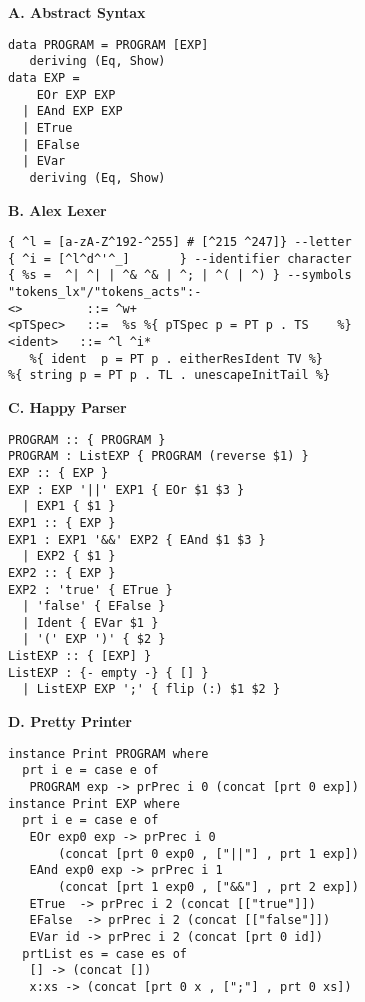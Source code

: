 \begin{figure}
\begin{boxedminipage}[t]{\textwidth}
\begin{minipage}[l]{0.48\textwidth}

\textbf{A. Abstract Syntax}
\scriptsize
\begin{verbatim}
data PROGRAM = PROGRAM [EXP]
   deriving (Eq, Show)
data EXP =
    EOr EXP EXP
  | EAnd EXP EXP
  | ETrue
  | EFalse
  | EVar
   deriving (Eq, Show)
\end{verbatim}
\normalsize
\textbf{B. Alex Lexer}

\scriptsize
\begin{verbatim}
{ ^l = [a-zA-Z^192-^255] # [^215 ^247]} --letter
{ ^i = [^l^d^'^_]       } --identifier character
{ %s =  ^| ^| | ^& ^& | ^; | ^( | ^) } --symbols
"tokens_lx"/"tokens_acts":-
<>         ::= ^w+
<pTSpec>   ::=  %s %{ pTSpec p = PT p . TS    %}
<ident>   ::= ^l ^i*   
   %{ ident  p = PT p . eitherResIdent TV %}
%{ string p = PT p . TL . unescapeInitTail %}
\end{verbatim}
\normalsize
\textbf{C. Happy Parser}

\scriptsize
\begin{verbatim}
PROGRAM :: { PROGRAM }
PROGRAM : ListEXP { PROGRAM (reverse $1) } 
EXP :: { EXP }
EXP : EXP '||' EXP1 { EOr $1 $3 } 
  | EXP1 { $1 }
EXP1 :: { EXP }
EXP1 : EXP1 '&&' EXP2 { EAnd $1 $3 } 
  | EXP2 { $1 }
EXP2 :: { EXP }
EXP2 : 'true' { ETrue } 
  | 'false' { EFalse }
  | Ident { EVar $1 }
  | '(' EXP ')' { $2 }
ListEXP :: { [EXP] }
ListEXP : {- empty -} { [] } 
  | ListEXP EXP ';' { flip (:) $1 $2 }
\end{verbatim}
\normalsize
\end{minipage}
\hfill
\begin{minipage}[r]{0.48\textwidth}

\textbf{D. Pretty Printer}

\scriptsize
\begin{verbatim}
instance Print PROGRAM where
  prt i e = case e of
   PROGRAM exp -> prPrec i 0 (concat [prt 0 exp])
instance Print EXP where
  prt i e = case e of
   EOr exp0 exp -> prPrec i 0 
       (concat [prt 0 exp0 , ["||"] , prt 1 exp])
   EAnd exp0 exp -> prPrec i 1 
       (concat [prt 1 exp0 , ["&&"] , prt 2 exp])
   ETrue  -> prPrec i 2 (concat [["true"]])
   EFalse  -> prPrec i 2 (concat [["false"]])
   EVar id -> prPrec i 2 (concat [prt 0 id])
  prtList es = case es of
   [] -> (concat [])
   x:xs -> (concat [prt 0 x , [";"] , prt 0 xs])
\end{verbatim}
\normalsize


\end{minipage}
\end{boxedminipage}
\end{figure}
